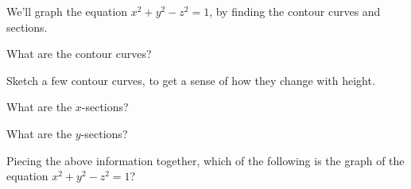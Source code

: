 \documentclass{ximera}
\begin{document}
\begin{example}
We'll graph the equation $x^2+y^2-z^2=1$, by finding the contour curves and sections.

What are the contour curves?
\begin{multipleChoice}
\end{multipleChoice}

Sketch a few contour curves, to get a sense of how they change with height.

What are the $x$-sections?
\begin{multipleChoice}
\end{multipleChoice}

What are the $y$-sections?
\begin{multipleChoice}
\end{multipleChoice}

Piecing the above information together, which of the following is the graph of the equation $x^2+y^2-z^2=1$?


\end{example}
\end{document}
